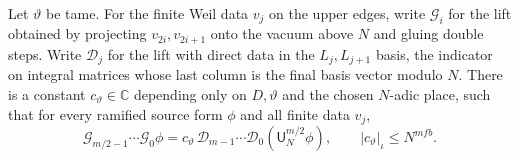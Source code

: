 \begin{lemma}
\label{lem:a-level-direct-chain}
\emitthmsource
Let $\vartheta$ be tame. For the finite Weil data $v_j$ on the upper edges, write $\mathcal G_i$ for the lift obtained by projecting $v_{2i},v_{2i+1}$ onto the vacuum above $N$ and gluing double steps. Write $\mathcal D_j$ for the lift with direct data in the $L_j,L_{j+1}$ basis, the indicator on integral matrices whose last column is the final basis vector modulo $N$. There is a constant $c_\vartheta\in\mathbb C$ depending only on $D,\vartheta$ and the chosen $N$-adic place, such that for every ramified source form $\phi$ and all finite data $v_j$,
\[
 \mathcal G_{m/2-1}\cdots\mathcal G_0\phi
 =c_\vartheta\,\mathcal D_{m-1}\cdots\mathcal D_0
                (\mathsf U_N^{m/2}\phi),\qquad
 |c_\vartheta|_\iota\le N^{mfb}.
\]
\end{lemma}
